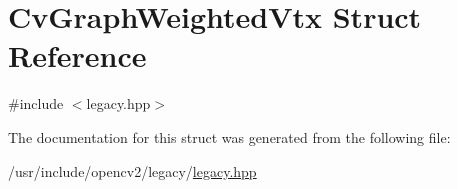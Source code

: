 \hypertarget{structCvGraphWeightedVtx}{\section{Cv\-Graph\-Weighted\-Vtx Struct Reference}
\label{structCvGraphWeightedVtx}
}


{\ttfamily \#include $<$legacy.\-hpp$>$}



The documentation for this struct was generated from the following file\-:\begin{DoxyCompactItemize}
\item 
/usr/include/opencv2/legacy/\hyperlink{legacy_8hpp}{legacy.\-hpp}\end{DoxyCompactItemize}
